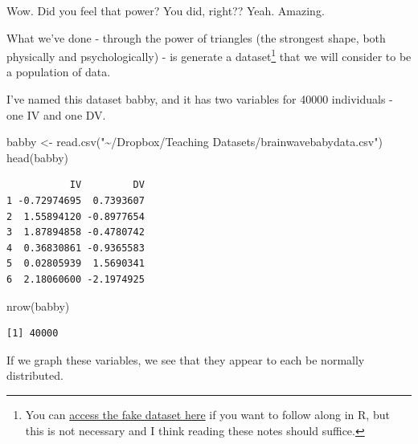 \documentclass[
  letterpaper,
  DIV=11,
  numbers=noendperiod,
  oneside]{scrreprt}
\newenvironment{Shaded}{\begin{snugshade}}{\end{snugshade}}
\newcommand{\AttributeTok}[1]{\textcolor[rgb]{0.40,0.45,0.13}{#1}}
\newcommand{\DecValTok}[1]{\textcolor[rgb]{0.68,0.00,0.00}{#1}}
\newcommand{\FunctionTok}[1]{\textcolor[rgb]{0.28,0.35,0.67}{#1}}
\newcommand{\NormalTok}[1]{\textcolor[rgb]{0.00,0.23,0.31}{#1}}
\newcommand{\OtherTok}[1]{\textcolor[rgb]{0.00,0.23,0.31}{#1}}
\newcommand{\SpecialCharTok}[1]{\textcolor[rgb]{0.37,0.37,0.37}{#1}}
\newcommand{\StringTok}[1]{\textcolor[rgb]{0.13,0.47,0.30}{#1}}
\begin{document}
Wow. Did you feel that power? You did, right?? Yeah. Amazing.

What we've done - through the power of triangles (the strongest shape,
both physically and psychologically) - is generate a dataset\footnote{You
  can
  \href{https://www.dropbox.com/scl/fi/cvcwam7xe202nuocbfmbp/brainwavebabydata.csv?rlkey=5hi2xknvv83cgydurts31fvlw&dl=0}{access
  the fake dataset here} if you want to follow along in R, but this is
  not necessary and I think reading these notes should suffice.} that we
will consider to be a population of data.

I've named this dataset babby, and it has two variables for 40000
individuals - one IV and one DV.

\begin{Shaded}
\begin{Highlighting}[]
\NormalTok{babby }\OtherTok{\textless{}{-}} \FunctionTok{read.csv}\NormalTok{(}\StringTok{"\textasciitilde{}/Dropbox/Teaching Datasets/brainwavebabydata.csv"}\NormalTok{)}
\FunctionTok{head}\NormalTok{(babby)}
\end{Highlighting}
\end{Shaded}

\begin{verbatim}
           IV         DV
1 -0.72974695  0.7393607
2  1.55894120 -0.8977654
3  1.87894858 -0.4780742
4  0.36830861 -0.9365583
5  0.02805939  1.5690341
6  2.18060600 -2.1974925
\end{verbatim}

\begin{Shaded}
\begin{Highlighting}[]
\FunctionTok{nrow}\NormalTok{(babby)}
\end{Highlighting}
\end{Shaded}

\begin{verbatim}
[1] 40000
\end{verbatim}

If we graph these variables, we see that they appear to each be normally
distributed.~

\begin{Shaded}
\end{Shaded}
\end{document}
